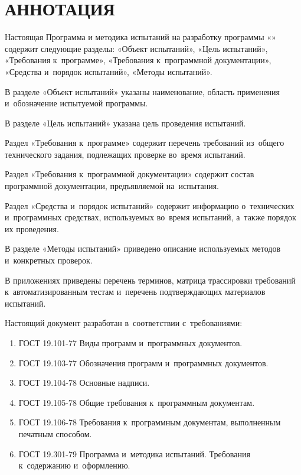 \documentclass[12pt,a4paper]{extarticle}
\begin{document}
\sloppy




\section*{АННОТАЦИЯ}

Настоящая Программа и методика испытаний на разработку программы «\hseProjectName» содержит следующие разделы: «Объект испытаний», «Цель испытаний», «Требования к~программе», «Требования к~программной документации», «Средства и~порядок испытаний», «Методы испытаний».

В разделе «Объект испытаний» указаны наименование, область применения и~обозначение испытуемой программы.

В разделе «Цель испытаний» указана цель проведения испытаний.

Раздел «Требования к~программе» содержит перечень требований из~общего технического задания, подлежащих проверке во~время испытаний.

Раздел «Требования к~программной документации» содержит состав программной документации, предъявляемой на~испытания.

Раздел «Средства и~порядок испытаний» содержит информацию о~технических и~программных средствах, используемых во~время испытаний, а~также порядок их проведения.

В разделе «Методы испытаний» приведено описание используемых методов и~конкретных проверок.

В приложениях приведены перечень терминов, матрица трассировки требований к~автоматизированным тестам и~перечень подтверждающих материалов испытаний.

\clearpage

\noindent
Настоящий документ разработан в~соответствии с~требованиями:

\begin{enumerate}[label=\arabic*), leftmargin=1.25cm]
\item ГОСТ 19.101-77 Виды программ и~программных документов\cite{gost19101}.
\item ГОСТ 19.103-77 Обозначения программ и~программных документов\cite{gost19103}.
\item ГОСТ 19.104-78 Основные надписи\cite{gost19104}.
\item ГОСТ 19.105-78 Общие требования к~программным документам\cite{gost19105}.
\item ГОСТ 19.106-78 Требования к~программным документам, выполненным
      печатным способом\cite{gost19106}.
\item ГОСТ 19.301-79 Программа и~методика испытаний. Требования
      к~содержанию и~оформлению\cite{gost19301}.
\end{enumerate}
\end{document}
